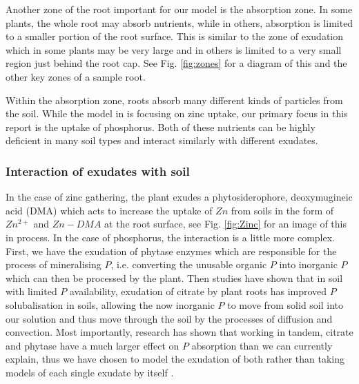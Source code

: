 \documentclass[11pt]{article}
\begin{document}
Another zone of the root important for our model is the absorption zone. In some plants, the whole root may absorb nutrients, while in others, absorption is limited to a smaller portion of the root surface. This is similar to the zone of exudation which in some plants may be very large and in others is limited to a very small region just behind the root cap. See Fig. \ref{fig:zones} for a diagram of this and the other key zones of a sample root.

Within the absorption zone, roots absorb many different kinds of particles from the soil. While the model in \cite{Ptashnyk-2011} is focusing on zinc uptake, our primary focus in this report is the uptake of phosphorus. Both of these nutrients can be highly deficient in many soil types and interact similarly with different exudates.

\subsubsection{Interaction of exudates with soil}
In the case of zinc  gathering, the plant exudes a phytosiderophore, deoxymugineic acid (DMA) which acts to increase the uptake of $Zn$ from soils in the form of $Zn^{2+}$ and $Zn-DMA$ at the root surface, see Fig. \ref{fig:Zinc} for an image of this in process. In the case of phosphorus, the interaction is a little more complex. First, we have the exudation of phytase enzymes which are responsible for the process of mineralising $P$, i.e. converting the unusable organic $P$ into inorganic $P$ which can then be processed by the plant. Then studies have shown that in soil with limited $P$ availability, exudation of citrate by plant roots has improved $P$ solubalisation in soils, allowing the now inorganic $P$ to move from solid soil into our solution and thus move through the soil by the processes of diffusion and convection. Most importantly, research has shown that working in tandem, citrate and phytase have a much larger effect on $P$ absorption than we can currently explain, thus we have chosen to model the exudation of both rather than taking models of each single exudate by itself \cite{giles_george}.
\end{document}
